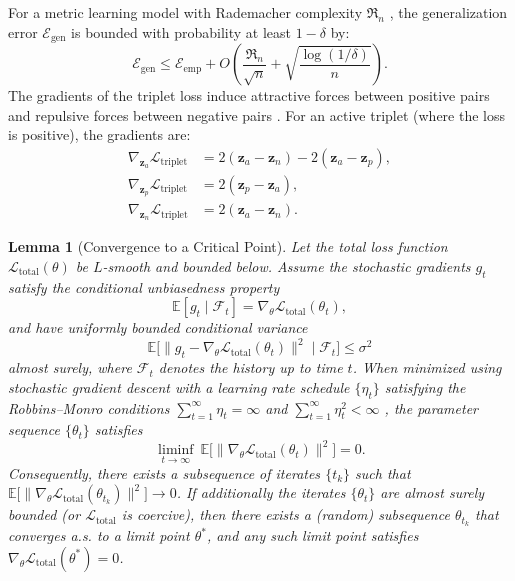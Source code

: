 \documentclass[a4paper,12pt,reqno]{amsart}
\newtheorem{lemma}[theorem]{\textbf{Lemma} }
\theoremstyle{definition}
\theoremstyle{remark}
\begin{document}
For a metric learning model with Rademacher complexity $\mathfrak{R}_n$ \cite{shalev2014understanding,mohri2018foundations}, the generalization error $\mathcal{E}_{\text{gen}}$ is bounded with probability at least $1-\delta$ by:
\begin{equation}
	\mathcal{E}_{\text{gen}} \leq \mathcal{E}_{\text{emp}} + O\left(\frac{\mathfrak{R}_n}{\sqrt{n}} + \sqrt{\frac{\log(1/\delta)}{n}}\right).
\end{equation}
The gradients of the triplet loss induce attractive forces between positive pairs and repulsive forces between negative pairs \cite{schroff2015facenet}. For an active triplet (where the loss is positive), the gradients are:
\begin{align}
	\nabla_{\mathbf{z}_a} \mathcal{L}_{\text{triplet}} &= 2(\mathbf{z}_a - \mathbf{z}_n) - 2(\mathbf{z}_a - \mathbf{z}_p), \\
	\nabla_{\mathbf{z}_p} \mathcal{L}_{\text{triplet}} &= 2(\mathbf{z}_p - \mathbf{z}_a), \\
	\nabla_{\mathbf{z}_n} \mathcal{L}_{\text{triplet}} &= 2(\mathbf{z}_a - \mathbf{z}_n).
\end{align}

\begin{lemma}[Convergence to a Critical Point]
	\label{lemma:convergence}
	Let the total loss function $\mathcal{L}_{\text{total}}(\theta)$ be $L$-smooth and bounded below. 
	Assume the stochastic gradients $g_t$ satisfy the conditional unbiasedness property
	\[
	\mathbb{E}[g_t \mid \mathcal{F}_t] = \nabla_\theta \mathcal{L}_{\text{total}}(\theta_t),
	\]
	and have uniformly bounded conditional variance
	\[
	\mathbb{E}\big[\|g_t - \nabla_\theta \mathcal{L}_{\text{total}}(\theta_t)\|^2 \mid \mathcal{F}_t\big] \leq \sigma^2
	\]
	almost surely, where $\mathcal{F}_t$ denotes the history up to time $t$. 
	When minimized using stochastic gradient descent with a learning rate schedule $\{\eta_t\}$ satisfying the Robbins--Monro conditions 
	$\sum_{t=1}^\infty \eta_t = \infty$ and $\sum_{t=1}^\infty \eta_t^2 < \infty$ \cite{robbins1951stochastic}, 
	the parameter sequence $\{\theta_t\}$ satisfies
	\[
	\liminf_{t \to \infty} \ \mathbb{E}\big[\|\nabla_{\theta} \mathcal{L}_{\text{total}}(\theta_t)\|^2\big] = 0.
	\]
	Consequently, there exists a subsequence of iterates $\{t_k\}$ such that
	\(\mathbb{E}\big[\|\nabla_{\theta} \mathcal{L}_{\text{total}}(\theta_{t_k})\|^2\big]\to 0\).
	If additionally the iterates $\{\theta_t\}$ are almost surely bounded (or $\mathcal{L}_{\text{total}}$ is coercive), then there exists a (random) subsequence $\theta_{t_k}$ that converges a.s. to a limit point $\theta^*$, and any such limit point satisfies $\nabla_{\theta}\mathcal{L}_{\text{total}}(\theta^*)=0$.
\end{lemma}
\end{document}
